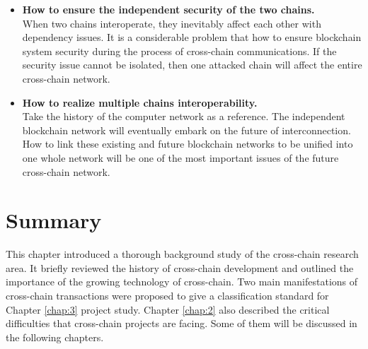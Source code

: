 \begin{itemize}
    \item \textbf{How to ensure the independent security of the two chains.} \\
    When two chains interoperate, they inevitably affect each other with dependency issues. It is a considerable problem that how to ensure blockchain system security during the process of cross-chain communications. If the security issue cannot be isolated, then one attacked chain will affect the entire cross-chain network.
    \item \textbf{How to realize multiple chains interoperability.} \\
    Take the history of the computer network as a reference. The independent blockchain network will eventually embark on the future of interconnection. How to link these existing and future blockchain networks to be unified into one whole network will be one of the most important issues of the future cross-chain network. 
\end{itemize}

\section{Summary}

\noindent This chapter introduced a thorough background study of the cross-chain research area. It briefly reviewed the history of cross-chain development and outlined the importance of the growing technology of cross-chain. Two main manifestations of cross-chain transactions were proposed to give a classification standard for Chapter \ref{chap:3} project study. Chapter \ref{chap:2} also described the critical difficulties that cross-chain projects are facing. Some of them will be discussed in the following chapters.